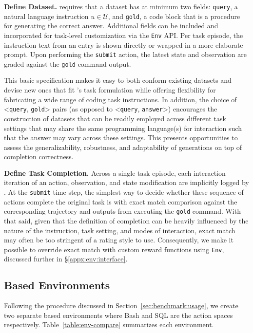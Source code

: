 \textbf{Define Dataset.} \benchmark{} requires that a dataset has at minimum two fields: \texttt{query}, a natural language instruction $u \in \mathcal{U}$, and \texttt{gold}, a code block that is a procedure for generating the correct answer. 
Additional fields can be included and incorporated for task-level customization via the \texttt{\benchmark{}Env} API.
Per task episode, the instruction text from an entry is shown directly or wrapped in a more elaborate prompt. Upon performing the \texttt{submit} action, the latest state and observation are graded against the \texttt{gold} command output.

This basic specification makes it easy to both conform existing datasets and devise new ones that fit \benchmark{}'s task formulation while offering flexibility for fabricating a wide range of coding task instructions.
In addition, the choice of <\texttt{query}, \texttt{gold}> pairs (as opposed to <\texttt{query}, \texttt{answer}>) encourages the construction of datasets that can be readily employed across different \benchmark{} task settings that may share the same programming language(s) for interaction such that the answer may vary across these settings. This presents opportunities to assess the generalizability, robustness, and adaptability of generations on top of completion correctness.

\textbf{Define Task Completion.} Across a single task episode, each interaction iteration of an action, observation, and state modification are implicitly logged by \benchmark{}.
At the \texttt{submit} time step, the simplest way to decide whether these sequence of actions complete the original task is with exact match comparison against the corresponding trajectory and outputs from executing the \texttt{gold} command.
With that said, given that the definition of completion can be heavily influenced by the nature of the instruction, task setting, and modes of interaction, exact match may often be too stringent of a rating style to use. 
Consequently, we make it possible to override exact match with custom reward functions using \texttt{\benchmark{}Env}, discussed further in \S\ref{appx:env:interface}.

\subsection{\benchmark{} Based Environments}
Following the procedure discussed in Section~\ref{sec:benchmark:usage}, we create two separate \benchmark{} based environments where Bash and SQL are the action spaces respectively. Table~\ref{table:env-compare} summarizes each environment.

